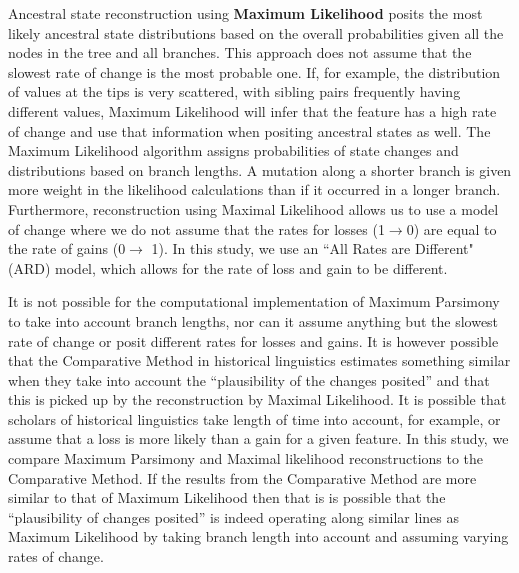 \documentclass[a4paper,10pt]{article} %
\begin{document}
Ancestral state reconstruction using \textbf{Maximum Likelihood} posits the most likely ancestral state distributions based on the overall probabilities given all the nodes in the tree and all branches. This approach does not assume that the slowest rate of change is the most probable one. If, for example, the distribution of values at the tips is very scattered, with sibling pairs frequently having different values, Maximum Likelihood will infer that the feature has a high rate of change and use that information when positing ancestral states as well. The Maximum Likelihood algorithm assigns probabilities of state changes and distributions based on branch lengths. A mutation along a shorter branch is given more weight in the likelihood calculations than if it occurred in a longer branch. Furthermore, reconstruction using Maximal Likelihood allows us to use a model of change where we do not assume that the rates for losses (1$\rightarrow$0) are equal to the rate of gains (0$\rightarrow$ 1). In this study, we use an ``All Rates are Different" (ARD) model, which allows for the rate of loss and gain to be different. 

It is not possible for the computational implementation of Maximum Parsimony to take into account branch lengths, nor can it assume anything but the slowest rate of change or posit different rates for losses and gains. It is however possible that the Comparative Method in historical linguistics estimates something similar when they take into account the ``plausibility of the changes posited'' and that this is picked up by the reconstruction by Maximal Likelihood. It is possible that scholars of historical linguistics take length of time into account, for example, or assume that a loss is more likely than a gain for a given feature. In this study, we compare Maximum Parsimony and Maximal likelihood reconstructions to the Comparative Method. If the results from the Comparative Method are more similar to that of Maximum Likelihood then that is is possible that the ``plausibility of changes posited'' is indeed operating along similar lines as Maximum Likelihood by taking branch length into account and assuming varying rates of change.

 
\end{document}
